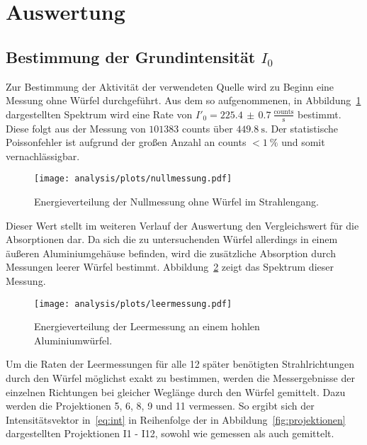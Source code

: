 \section{Auswertung}
\label{sec:auswertung}



\subsection{Bestimmung der Grundintensität $I_0$}

Zur Bestimmung der Aktivität der verwendeten Quelle wird zu Beginn eine 
Messung ohne Würfel durchgeführt. Aus dem so aufgenommenen, in 
Abbildung~\ref{fig:nullmessung} dargestellten Spektrum wird eine Rate von 
$I'_0 = 225.4\,\pm\,0.7\:\frac{\text{counts}}{\text{s}}$ bestimmt. Diese 
folgt aus der Messung von $101383$ counts über $\SI{449.8}{\second}$. Der 
statistische Poissonfehler ist aufgrund der großen Anzahl an counts 
$<\SI{1}{\percent}$ und somit vernachlässigbar.

\begin{figure}
    \centering
    \texttt{[image: analysis/plots/nullmessung.pdf]}
    \caption{Energieverteilung der Nullmessung ohne Würfel im Strahlengang.}
    \label{fig:nullmessung}
\end{figure}

Dieser Wert stellt im weiteren Verlauf der Auswertung den Vergleichswert für 
die Absorptionen dar. Da sich die zu untersuchenden Würfel allerdings in einem 
äußeren Aluminiumgehäuse befinden, wird die zusätzliche Absorption durch 
Messungen leerer Würfel bestimmt. Abbildung~\ref{fig:leermessung} zeigt das 
Spektrum dieser Messung.

\begin{figure}
    \centering
    \texttt{[image: analysis/plots/leermessung.pdf]}
    \caption{Energieverteilung der Leermessung an einem hohlen Aluminiumwürfel.}
    \label{fig:leermessung}
\end{figure}

Um die Raten der Leermessungen für alle 12 später benötigten Strahlrichtungen 
durch den Würfel möglichst exakt zu bestimmen, werden die Messergebnisse der 
einzelnen Richtungen bei gleicher Weglänge durch den Würfel gemittelt. Dazu 
werden die Projektionen 5, 6, 8, 9 und 11 vermessen. So ergibt sich der  
Intensitätsvektor in~\eqref{eq:int} in Reihenfolge der in 
Abbildung~\ref{fig:projektionen} dargestellten Projektionen I1 - I12, sowohl 
wie gemessen als auch gemittelt.

